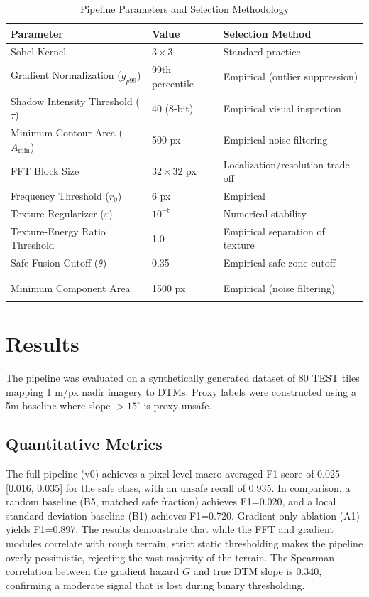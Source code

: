 \documentclass{article}
\begin{document}
\begin{table}[htbp]
\centering
\caption{Pipeline Parameters and Selection Methodology}
\begin{tabular}{@{}lll@{}}
\toprule
\textbf{Parameter} & \textbf{Value} & \textbf{Selection Method} \\ \midrule
Sobel Kernel & $3 \times 3$ & Standard practice \cite{sobel1968} \\
Gradient Normalization ($g_{p99}$) & 99th percentile & Empirical (outlier suppression) \\
Shadow Intensity Threshold ($\tau$) & 40 (8-bit) & Empirical visual inspection \\
Minimum Contour Area ($A_{\min}$) & 500 px & Empirical noise filtering \\
FFT Block Size & $32 \times 32$ px & Localization/resolution trade-off \\
Frequency Threshold ($r_0$) & 6 px & Empirical \\
Texture Regularizer ($\varepsilon$) & $10^{-8}$ & Numerical stability \\
Texture-Energy Ratio Threshold & 1.0 & Empirical separation of texture \\
Safe Fusion Cutoff ($\theta$) & 0.35 & Empirical safe zone cutoff \\\\\\
Minimum Component Area & 1500 px & Empirical (noise filtering) \\\\
\bottomrule
\end{tabular}
\label{tab:parameters}
\end{table}

\section{Results}
\label{sec:results}
The pipeline was evaluated on a synthetically generated dataset of 80 TEST tiles mapping 1 m/px nadir imagery to DTMs. Proxy labels were constructed using a 5m baseline where slope $> 15^\circ$ is proxy-unsafe. 

\subsection{Quantitative Metrics}
The full pipeline (v0) achieves a pixel-level macro-averaged F1 score of 0.025 [0.016, 0.035] for the safe class, with an unsafe recall of 0.935. In comparison, a random baseline (B5, matched safe fraction) achieves F1=0.020, and a local standard deviation baseline (B1) achieves F1=0.720. Gradient-only ablation (A1) yields F1=0.897. The results demonstrate that while the FFT and gradient modules correlate with rough terrain, strict static thresholding makes the pipeline overly pessimistic, rejecting the vast majority of the terrain. The Spearman correlation between the gradient hazard $G$ and true DTM slope is 0.340, confirming a moderate signal that is lost during binary thresholding. 
\end{document}
